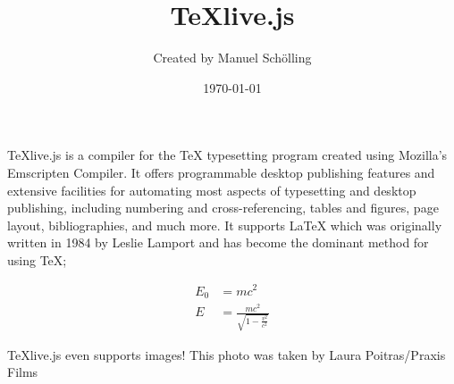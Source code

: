 \documentclass[12pt]{article}
\title{\TeX live.js}
\author{Created by Manuel Sch\"olling}
\date{\today}
\begin{document}
  \maketitle
  \TeX{}live.js is a compiler for the \TeX{}
  typesetting program created using Mozilla's Emscripten
  Compiler. It offers programmable desktop
  publishing features and extensive facilities for
  automating most aspects of typesetting and desktop
  publishing, including numbering and cross-referencing,
  tables and figures, page layout, bibliographies, and
  much more. It supports \LaTeX{} which was originally written 
  in 1984 by Leslie Lamport and has become the dominant method for
  using \TeX;
 
  \begin{align}
    E_0 &= mc^2                              \\
    E &= \frac{mc^2}{\sqrt{1-\frac{v^2}{c^2}}}
  \end{align}


  \TeX{}live.js even supports images! This photo was taken by Laura Poitras/Praxis Films
\end{document}

